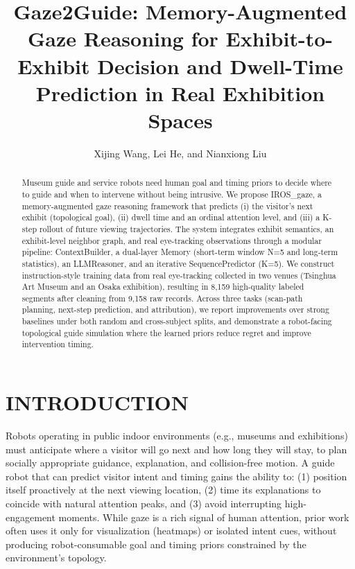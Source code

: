 \documentclass[letterpaper]{article}
\begin{document}
\title{Gaze2Guide: Memory-Augmented Gaze Reasoning for Exhibit-to-Exhibit Decision and Dwell-Time Prediction in Real Exhibition Spaces}
\author{Xijing Wang, Lei He, and Nianxiong Liu}
\date{}

\maketitle

\begin{abstract}
Museum guide and service robots need human goal and timing priors to decide where to guide and when to intervene without being intrusive. We propose IROS\_gaze, a memory-augmented gaze reasoning framework that predicts (i) the visitor's next exhibit (topological goal), (ii) dwell time and an ordinal attention level, and (iii) a K-step rollout of future viewing trajectories. The system integrates exhibit semantics, an exhibit-level neighbor graph, and real eye-tracking observations through a modular pipeline: ContextBuilder, a dual-layer Memory (short-term window N=5 and long-term statistics), an LLMReasoner, and an iterative SequencePredictor (K=5). We construct instruction-style training data from real eye-tracking collected in two venues (Tsinghua Art Museum and an Osaka exhibition), resulting in 8,159 high-quality labeled segments after cleaning from 9,158 raw records. Across three tasks (scan-path planning, next-step prediction, and attribution), we report improvements over strong baselines under both random and cross-subject splits, and demonstrate a robot-facing topological guide simulation where the learned priors reduce regret and improve intervention timing.
\end{abstract}

\section{INTRODUCTION}

Robots operating in public indoor environments (e.g., museums and exhibitions) must anticipate where a visitor will go next and how long they will stay, to plan socially appropriate guidance, explanation, and collision-free motion. A guide robot that can predict visitor intent and timing gains the ability to: (1) position itself proactively at the next viewing location, (2) time its explanations to coincide with natural attention peaks, and (3) avoid interrupting high-engagement moments. While gaze is a rich signal of human attention, prior work often uses it only for visualization (heatmaps) or isolated intent cues, without producing robot-consumable goal and timing priors constrained by the environment's topology.
\end{document}
